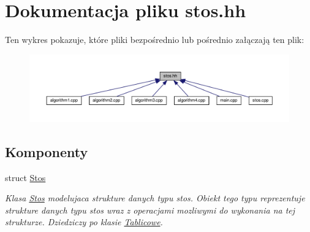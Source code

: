 \hypertarget{stos_8hh}{\section{Dokumentacja pliku stos.\-hh}
\label{stos_8hh}
}
Ten wykres pokazuje, które pliki bezpośrednio lub pośrednio załączają ten plik\-:\nopagebreak
\begin{figure}[H]
\begin{center}
\leavevmode
\includegraphics[width=350pt]{stos_8hh__dep__incl}
\end{center}
\end{figure}
\subsection*{Komponenty}
\begin{DoxyCompactItemize}
\item 
struct \hyperlink{struct_stos}{Stos}
\begin{DoxyCompactList}\small\item\em Klasa \hyperlink{struct_stos}{Stos} modelujaca strukture danych typu stos. Obiekt tego typu reprezentuje strukture danych typu stos wraz z operacjami mozliwymi do wykonania na tej strukturze. Dziedziczy po klasie \hyperlink{class_tablicowe}{Tablicowe}. \end{DoxyCompactList}\end{DoxyCompactItemize}
